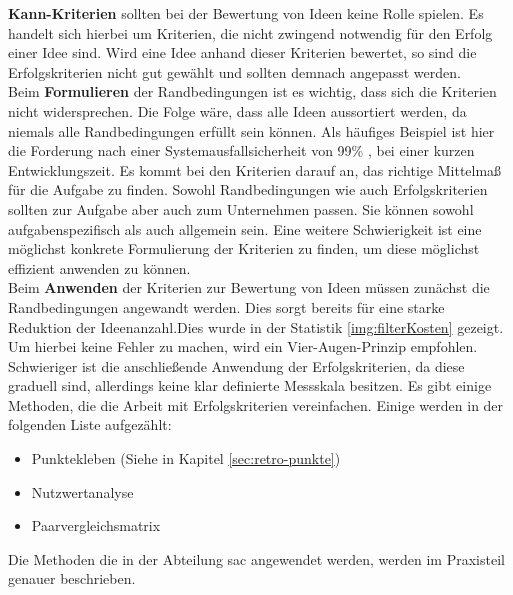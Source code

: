 \textbf{Kann-Kriterien} sollten bei der Bewertung von Ideen keine Rolle spielen. Es handelt sich hierbei 
um Kriterien, die nicht zwingend notwendig für den Erfolg einer Idee sind. Wird eine Idee anhand dieser Kriterien 
bewertet, so sind die Erfolgskriterien nicht gut gewählt und sollten demnach angepasst werden.\\

Beim \textbf{Formulieren} der Randbedingungen ist es wichtig, dass sich die Kriterien nicht
widersprechen. Die Folge wäre, dass alle Ideen aussortiert werden, da niemals alle Randbedingungen erfüllt sein können.
Als häufiges Beispiel ist hier die Forderung nach einer Systemausfallsicherheit von 99\% , bei einer
kurzen Entwicklungszeit. 
Es kommt bei den Kriterien darauf an, das richtige Mittelmaß für die Aufgabe zu finden. 
Sowohl Randbedingungen wie auch Erfolgskriterien sollten zur Aufgabe aber auch zum Unternehmen passen. Sie können sowohl aufgabenspezifisch
als auch allgemein sein. Eine weitere Schwierigkeit ist eine möglichst konkrete
Formulierung der Kriterien zu finden, um diese möglichst effizient anwenden zu können. \\

Beim \textbf{Anwenden} der Kriterien zur Bewertung von Ideen müssen zunächst die Randbedingungen angewandt werden. 
Dies sorgt bereits für eine starke Reduktion der Ideenanzahl.Dies wurde in der Statistik \autoref{img:filterKosten} gezeigt. 
Um hierbei keine Fehler zu machen, wird ein Vier-Augen-Prinzip empfohlen. 
Schwieriger ist die anschließende Anwendung der Erfolgskriterien, da diese graduell sind, allerdings keine klar 
definierte Messskala besitzen. 
Es gibt einige Methoden, die die Arbeit mit Erfolgskriterien vereinfachen. Einige werden 
in der folgenden Liste aufgezählt: 
\begin{itemize}
    \item Punktekleben (Siehe in Kapitel \ref{sec:retro-punkte})
    \item Nutzwertanalyse
    \item Paarvergleichsmatrix
\end{itemize}
Die Methoden die in der Abteilung \ac{sac} angewendet werden, werden im Praxisteil genauer beschrieben. \cite{zephram:2018}

